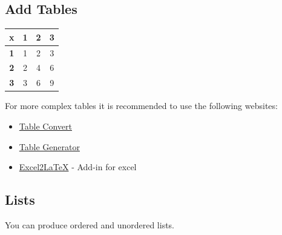 \documentclass{article} %
\begin{document}
    \subsection{ Add Tables}

    \begin{table}[H]
    \center
        \begin{tabular}{|c|c c c|}
            \toprule
            \textbf{x} & \textbf{1} & \textbf{2} & \textbf{3} \\ \midrule \hline
            \textbf{1} & 1          & 2          & 3          \\ 
            \textbf{2} & 2          & 4          & 6          \\ 
            \textbf{3} & 3          & 6          & 9          \\ \bottomrule
        \end{tabular}
    \end{table}

    \newline
    
    \quad For more complex tables it is recommended to use the following websites:
    \begin{itemize}
        \item \href{https://tableconvert.com/?output=latex }{Table Convert}
        \item \href{https://www.tablesgenerator.com/ }{Table Generator}
        \item \href{https://github.com/krlmlr/Excel2LaTeX}{Excel2LaTeX} - Add-in for excel
    \end{itemize}
    
    
    
\subsection{Lists}

\quad You can produce ordered and unordered lists.
\end{document}
